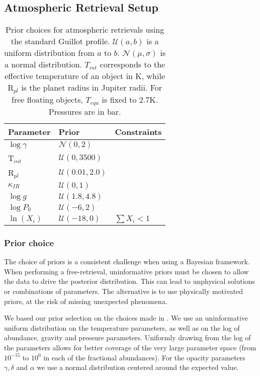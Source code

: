\subsection{Atmospheric Retrieval Setup}
\begin{table}[t]
	\centering
	\begin{tabular}{lll}
		\toprule
		\textbf{Parameter} & \textbf{Prior} & \textbf{Constraints}\\
		\midrule
		$\log\gamma$ & $\mathcal{N}(0,2)$&\\
		T$_{int}$ & $\mathcal{U}(0,3500)$&\\
		R$_{pl}$ & $\mathcal{U}(0.01,2.0)$&\\
		$\kappa_{IR}$ & $\mathcal{U}(0,1)$&\\
		$\log g$ & $\mathcal{U}(1.8,4.8)$&\\
		$\log P_{0}$ & $\mathcal{U}(-6,2)$&\\
		$\ln(X_{i})$ & $\mathcal{U}(-18,0)$ & $\sum X_{i} < 1$\\
		\bottomrule		
	\end{tabular}
	\caption{Prior choices for atmospheric retrievals using the standard Guillot profile. $\mathcal{U}(a,b)$ is a uniform distribution from $a$ to $b$. $\mathcal{N}(\mu,\sigma)$ is a normal distribution. $T_{int}$ corresponds to the effective temperature of an object in K, while R$_{pl}$ is the planet radius in Jupiter radii. For free floating objects, $T_{equ}$ is fixed to 2.7K. Pressures are in bar.}
	\label{tab:priors}
\end{table}

\subsubsection{Prior choice}
The choice of priors is a consistent challenge when using a Bayesian framework.
When performing a free-retrieval, uninformative priors must be chosen to allow the data to drive the posterior distribution.
This can lead to unphysical solutions or combinations of parameters.
The alternative is to use physically motivated priors, at the risk of missing unexpected phenomena.

We based our prior selection on the choices made in \parencite{Molliere2019}.
We use an uninformative uniform distribution on the temperature parameters, as well as on the log of abundance, gravity and pressure parameters.
Uniformly drawing from the log of the parameters allows for better coverage of the very large parameter space (from $10^{-15}$ to $10^{0}$ in each of the fractional abundances).
For the opacity parameters $\gamma,\delta$ and $\alpha$ we use a normal distribution centered around the expected value. 


